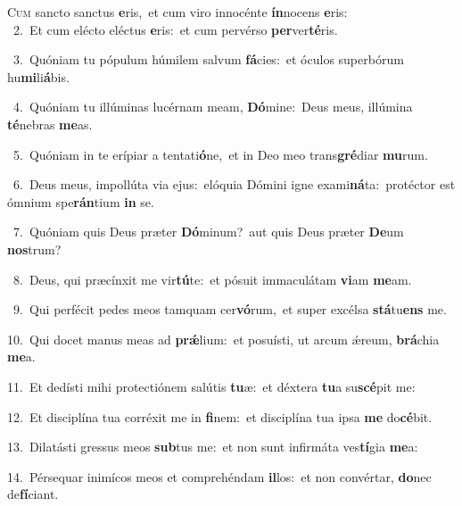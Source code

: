 \lettrine{\initial\textcolor{\initialcolor}{C}}{um} sancto sanctus \textbf{e}\-ris,~\star et cum viro innocénte \textbf{ín}\-nocens \textbf{e}\-ris:\\
{\numbfont\textcolor{\numbcolor}{~2.}}~Et cum elécto eléctus \textbf{e}\-ris:~\star et cum pervérso \textbf{per}\-ver\-\textbf{té}\-ris.\par
{\numbfont\textcolor{\numbcolor}{~3.}}~Quóniam tu pópulum húmilem salvum \textbf{fá}\-cies:~\star et óculos superbórum hu\-\textbf{mi}\-li\-\textbf{á}\-bis.\par
{\numbfont\textcolor{\numbcolor}{~4.}}~Quóniam tu illúminas lucérnam meam, \textbf{Dó}\-mine:~\star Deus meus, illúmina \textbf{té}\-nebras \textbf{me}\-as.\par
{\numbfont\textcolor{\numbcolor}{~5.}}~Quóniam in te erípiar a tentati\-\textbf{ó}\-ne,~\star et in Deo meo trans\-\textbf{gré}\-diar \textbf{mu}\-rum.\par
{\numbfont\textcolor{\numbcolor}{~6.}}~Deus meus, impollúta via ejus:~\dagger elóquia Dómini igne exami\-\textbf{ná}\-ta:~\star protéctor est ómnium spe\-\textbf{rán}\-tium \textbf{in} se.\par
{\numbfont\textcolor{\numbcolor}{~7.}}~Quóniam quis Deus præter \textbf{Dó}\-minum?~\star aut quis Deus præter \textbf{De}\-um \textbf{nos}\-trum?\par
{\numbfont\textcolor{\numbcolor}{~8.}}~Deus, qui præcínxit me vir\-\textbf{tú}\-te:~\star et pósuit immaculátam \textbf{vi}\-am \textbf{me}\-am.\par
{\numbfont\textcolor{\numbcolor}{~9.}}~Qui perfécit pedes meos tamquam cer\-\textbf{vó}\-rum,~\star et super excélsa \textbf{stá}\-tu\textbf{ens} me.\par
{\numbfont\textcolor{\numbcolor}{10.}}~Qui docet manus meas ad \textbf{prǽ}\-lium:~\star et posuísti, ut arcum ǽreum, \textbf{brá}\-chia \textbf{me}\-a.\par
{\numbfont\textcolor{\numbcolor}{11.}}~Et dedísti mihi protectiónem salútis \textbf{tu}\-æ:~\star et déxtera \textbf{tu}\-a su\-\textbf{scé}\-pit me:\par
{\numbfont\textcolor{\numbcolor}{12.}}~Et disciplína tua corréxit me in \textbf{fi}\-nem:~\star et disciplína tua ipsa \textbf{me} do\-\textbf{cé}\-bit.\par
{\numbfont\textcolor{\numbcolor}{13.}}~Dilatásti gressus meos \textbf{sub}\-tus me:~\star et non sunt infirmáta ves\-\textbf{tí}\-gia \textbf{me}\-a:\par
{\numbfont\textcolor{\numbcolor}{14.}}~Pérsequar inimícos meos et comprehéndam \textbf{il}\-los:~\star et non convértar, \textbf{do}\-nec de\-\textbf{fí}\-ciant.\par
